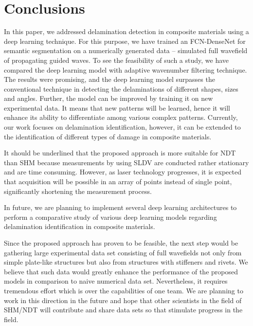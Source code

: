 \section{Conclusions}
In this paper, we addressed delamination detection in composite materials using a deep learning technique. 
For this purpose, we have trained an FCN-DenseNet for semantic segmentation on a numerically generated data -- simulated full wavefield of propagating guided waves.
To see the feasibility of such a study, we have compared the deep learning model with adaptive wavenumber filtering technique.
The results were promising, and the deep learning model surpasses the conventional technique in detecting the delaminations of different shapes, sizes and angles. 
Further, the model can be improved by training it on new experimental data.
It means that new patterns will be learned, hence it will enhance its ability to differentiate among various complex patterns.
Currently, our work focuses on delamination identification, however, it can be extended to the identification of different types of damage in composite materials.

It should be underlined that the proposed approach is more suitable for NDT than SHM because measurements by using SLDV are conducted rather stationary and are time consuming.
However, as laser technology progresses, it is expected that acquisition will be possible in an array of points instead of single point, significantly shortening the measurement process.

In future, we are planning to implement several deep learning architectures to perform a comparative study of various deep learning models regarding delamination identification in composite materials.

Since the proposed approach has proven to be feasible, the next step would be gathering large experimental data set consisting of full wavefields not only from simple plate-like structures but also from structures with stiffeners and rivets.
We believe that such data would greatly enhance the performance of the proposed models in comparison to naive numerical data set.
Nevertheless, it requires tremendous effort which is over the capabilities of one team.
We are planning to work in this direction in the future and hope that other scientists in the field of SHM/NDT will contribute and share data sets so that stimulate progress in the field.